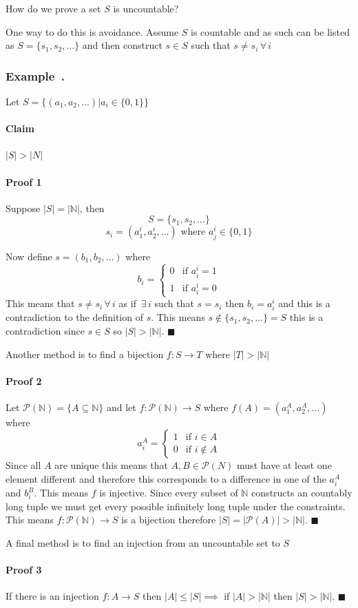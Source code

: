 \documentclass{article}
\newcommand{\bb}[1]{\mathbb{#1}}
\newcommand{\A}{\,\forall\,}
\newcommand{\E}{\,\exists\,}
\newcounter{example}[section]
\newenvironment{example}[1][]{\refstepcounter{example}\vspace{-0.2cm}
\subsubsection*{Example~\thesection.\theexample} \rmfamily}{\par}
\begin{document}
How do we prove a set \(S\) is uncountable?

One way to do this is avoidance. Assume \(S\) is countable and as such can be listed as \(S=\{s_1,s_2,\dotsc\}\) and then construct \(s\in S\) such that \(s\ne s_i\A i\)

\begin{example}
Let \(S=\{(a_1,a_2,\dotsc)|a_i\in \{0,1\}\}\)

\paragraph{Claim} \(|S|>|N|\)

\paragraph{Proof 1} Suppose \(|S|=|\bb N|\), then 
\[S=\{s_1,s_2,\dotsc\}\]
\[s_i=(a_1^i,a_2^i,\dotsc)\text{ where }a_j^i\in\{0,1\}\]

Now define \(s=(b_1,b_2,\dotsc)\) where
\[b_i=\left\{
\begin{array}{cc}
0 & \text{if }a_i^i=1\\
1 & \text{if }a_i^i=0
\end{array}
\right.\]
This means that \(s\ne s_i\A i\) as if \(\E i\) such that \(s=s_i\) then \(b_i=a_i^i\) and this is a contradiction to the definition of \(s\). This means \(s\not\in\{s_1,s_2,\dotsc\}=S\) this is a contradiction since \(s\in S\) so \(|S|>|\bb N|\). \(\blacksquare\)

Another method is to find a bijection \(f:S\to T\) where \(|T|>|\bb N|\)

\paragraph{Proof 2} Let \(\mathcal P(\bb N)=\{A\subseteq\bb N\}\) and let \(f:\mathcal P(\bb N)\to S\) where \(f(A)=(a_1^A,a_2^A,\dotsc)\) where
\[a_i^A=\left\{
\begin{array}{cc}
1 & \text{if }i\in A\\
0 & \text{if }i\not\in A
\end{array}
\right.\]
Since all \(A\) are unique this means that \(A,B\in\mathcal P(N)\) must have at least one element different and therefore this corresponds to a difference in one of the \(a_i^A\) and \(b_i^B\). This means \(f\) is injective. Since every subset of \(\bb N\) constructs an countably long tuple we must get every possible infinitely long tuple under the constraints. This means \(f:\mathcal P(\bb N)\to S\) is a bijection therefore \(|S|=|\mathcal P(A)|>|\bb N|\). \(\blacksquare\)

A final method is to find an injection from an uncountable set to \(S\)

\paragraph{Proof 3} If there is an injection \(f:A\to S\) then \(|A|\le|S|\implies\) if \(|A|>|\bb N|\) then \(|S|>|\bb N|\). \(\blacksquare\)
\end{example}
\end{document}
